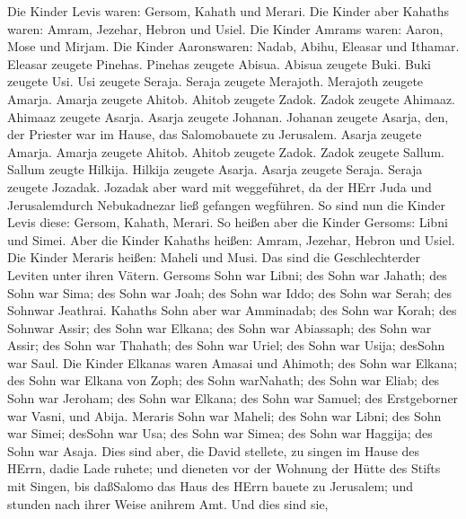  Die Kinder Levis waren: Gersom, Kahath und Merari.
 Die Kinder aber Kahaths waren: Amram, Jezehar, Hebron und
Usiel.  Die Kinder Amrams waren: Aaron, Mose und Mirjam. Die
Kinder Aaronswaren: Nadab, Abihu, Eleasar und Ithamar. 
Eleasar zeugete Pinehas. Pinehas zeugete Abisua.  Abisua
zeugete Buki. Buki zeugete Usi.  Usi zeugete Seraja. Seraja
zeugete Merajoth.  Merajoth zeugete Amarja. Amarja zeugete
Ahitob.  Ahitob zeugete Zadok. Zadok zeugete Ahimaaz.
 Ahimaaz zeugete Asarja. Asarja zeugete Johanan.
 Johanan zeugete Asarja, den, der Priester war im Hause,
das Salomobauete zu Jerusalem.  Asarja zeugete Amarja.
Amarja zeugete Ahitob.  Ahitob zeugete Zadok. Zadok zeugete
Sallum.  Sallum zeugte Hilkija. Hilkija zeugete Asarja.
 Asarja zeugete Seraja. Seraja zeugete Jozadak.
 Jozadak aber ward mit weggeführet, da der HErr Juda und
Jerusalemdurch Nebukadnezar ließ gefangen wegführen.  So
sind nun die Kinder Levis diese: Gersom, Kahath, Merari. 
So heißen aber die Kinder Gersoms: Libni und Simei.  Aber
die Kinder Kahaths heißen: Amram, Jezehar, Hebron und Usiel.
 Die Kinder Meraris heißen: Maheli und Musi. Das sind die
Geschlechterder Leviten unter ihren Vätern.  Gersoms Sohn
war Libni; des Sohn war Jahath; des Sohn war Sima;  des
Sohn war Joah; des Sohn war Iddo; des Sohn war Serah; des Sohnwar
Jeathrai.  Kahaths Sohn aber war Amminadab; des Sohn war
Korah; des Sohnwar Assir;  des Sohn war Elkana; des Sohn
war Abiassaph; des Sohn war Assir;  des Sohn war Thahath;
des Sohn war Uriel; des Sohn war Usija; desSohn war Saul. 
Die Kinder Elkanas waren Amasai und Ahimoth;  des Sohn war
Elkana; des Sohn war Elkana von Zoph; des Sohn warNahath; 
des Sohn war Eliab; des Sohn war Jeroham; des Sohn war Elkana;
 des Sohn war Samuel; des Erstgeborner war Vasni, und
Abija.  Meraris Sohn war Maheli; des Sohn war Libni; des
Sohn war Simei; desSohn war Usa;  des Sohn war Simea; des
Sohn war Haggija; des Sohn war Asaja.  Dies sind aber, die
David stellete, zu singen im Hause des HErrn, dadie Lade ruhete;
 und dieneten vor der Wohnung der Hütte des Stifts mit
Singen, bis daßSalomo das Haus des HErrn bauete zu Jerusalem; und
stunden nach ihrer Weise anihrem Amt.  Und dies sind sie,
